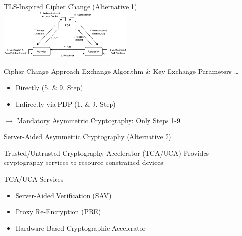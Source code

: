 \documentclass[en]{sdqbeamer}
\begin{document}
\begin{frame}{TLS-Inspired Cipher Change (Alternative 1)}
    \centering
    \includegraphics[width=0.5\textwidth]{./figures/access_control_request_delegation.drawio.pdf}
    \begin{greenblock}{Cipher Change Approach}
        Exchange Algorithm \& Key Exchange Parameters \dots
        \begin{itemize}
            \item Directly (5. \& 9. Step)
            \item Indirectly via PDP (1. \& 9. Step)
        \end{itemize}
        $\rightarrow$ Mandatory Asymmetric Cryptography: Only Steps 1-9
    \end{greenblock}
\end{frame}

\begin{frame}{Server-Aided Asymmetric Cryptography (Alternative 2)}
    \begin{greenblock}{Trusted/Untrusted Cryptography Accelerator (TCA/UCA)}
        Provides cryptography services to resource-constrained devices
    \end{greenblock}
    \begin{blueblock}{TCA/UCA Services}
        \begin{itemize}
            \item Server-Aided Verification (SAV) \parencite{Girault2005}
            \item Proxy Re-Encryption (PRE) \parencite{Green2007}
            \item Hardware-Based Cryptographic Accelerator
        \end{itemize}
    \end{blueblock}
\end{frame}
\end{document}
